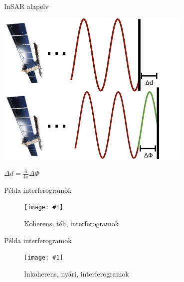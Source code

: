 \documentclass{beamer}
\newcommand\figu[3]{
    \begin{figure}
        \texttt{[image: \#1]}
        \caption{#3}
    \end{figure}
}
\begin{document}
\begin{frame}{InSAR alapelv}
    
    \begin{center}
        \includegraphics[width=0.7\textwidth]{interfero.png}
        
        $\Delta d = \frac{\lambda}{4\pi} \Delta \Phi$
    \end{center}
\end{frame}

\begin{frame}{Példa interferogramok}

    \begin{center}
        \figu{hun_nkp1.png}{0.9}{Koherens, téli, interferogramok}
    \end{center}

\end{frame}

\begin{frame}{Példa interferogramok}

    \begin{center}
        \figu{hun_nkp3.png}{0.9}{Inkoherens, nyári, interferogramok}
    \end{center}

\end{frame}
\end{document}
